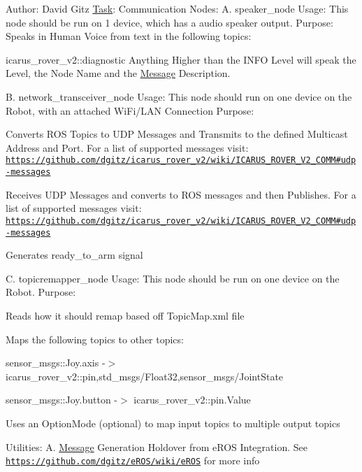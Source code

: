 Author\+: David Gitz \hyperlink{structTask}{Task}\+: Communication Nodes\+: A. speaker\+\_\+node Usage\+: This node should be run on 1 device, which has a audio speaker output. Purpose\+: Speaks in Human Voice from text in the following topics\+:
\begin{DoxyItemize}
\item icarus\+\_\+rover\+\_\+v2\+::diagnostic Anything Higher than the I\+N\+FO Level will speak the Level, the Node Name and the \hyperlink{structMessage}{Message} Description.
\end{DoxyItemize}

B. network\+\_\+transceiver\+\_\+node Usage\+: This node should run on one device on the Robot, with an attached Wi\+Fi/\+L\+AN Connection Purpose\+:
\begin{DoxyEnumerate}
\item Converts R\+OS Topics to U\+DP Messages and Transmits to the defined Multicast Address and Port. For a list of supported messages visit\+: \href{https://github.com/dgitz/icarus_rover_v2/wiki/ICARUS_ROVER_V2_COMM#udp-messages}{\tt https\+://github.\+com/dgitz/icarus\+\_\+rover\+\_\+v2/wiki/\+I\+C\+A\+R\+U\+S\+\_\+\+R\+O\+V\+E\+R\+\_\+\+V2\+\_\+\+C\+O\+M\+M\#udp-\/messages}
\item Receives U\+DP Messages and converts to R\+OS messages and then Publishes. For a list of supported messages visit\+: \href{https://github.com/dgitz/icarus_rover_v2/wiki/ICARUS_ROVER_V2_COMM#udp-messages}{\tt https\+://github.\+com/dgitz/icarus\+\_\+rover\+\_\+v2/wiki/\+I\+C\+A\+R\+U\+S\+\_\+\+R\+O\+V\+E\+R\+\_\+\+V2\+\_\+\+C\+O\+M\+M\#udp-\/messages}
\item Generates ready\+\_\+to\+\_\+arm signal
\end{DoxyEnumerate}

C. topicremapper\+\_\+node Usage\+: This node should be run on one device on the Robot. Purpose\+:
\begin{DoxyEnumerate}
\item Reads how it should remap based off Topic\+Map.\+xml file
\item Maps the following topics to other topics\+:
\begin{DoxyItemize}
\item sensor\+\_\+msgs\+::\+Joy.\+axis -\/$>$ icarus\+\_\+rover\+\_\+v2\+::pin,std\+\_\+msgs/\+Float32,sensor\+\_\+msgs/\+Joint\+State
\item sensor\+\_\+msgs\+::\+Joy.\+button -\/$>$ icarus\+\_\+rover\+\_\+v2\+::pin.\+Value
\end{DoxyItemize}
\item Uses an Option\+Mode (optional) to map input topics to multiple output topics
\end{DoxyEnumerate}

Utilities\+: A. \hyperlink{structMessage}{Message} Generation Holdover from e\+R\+OS Integration. See \href{https://github.com/dgitz/eROS/wiki/eROS}{\tt https\+://github.\+com/dgitz/e\+R\+O\+S/wiki/e\+R\+OS} for more info 